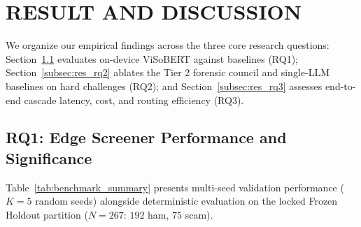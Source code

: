 \documentclass[journal]{IEEEtran}
\begin{document}
\section{RESULT AND DISCUSSION}
\label{sec:results}

We organize our empirical findings across the three core research questions: Section~\ref{subsec:res_rq1} evaluates on-device ViSoBERT against baselines (RQ1); Section~\ref{subsec:res_rq2} ablates the Tier 2 forensic council and single-LLM baselines on hard challenges (RQ2); and Section~\ref{subsec:res_rq3} assesses end-to-end cascade latency, cost, and routing efficiency (RQ3).

\subsection{RQ1: Edge Screener Performance and Significance}
\label{subsec:res_rq1}

Table~\ref{tab:benchmark_summary} presents multi-seed validation performance ($K=5$ random seeds) alongside deterministic evaluation on the locked Frozen Holdout partition ($N=267$: $192$ ham, $75$ scam).
\end{document}
